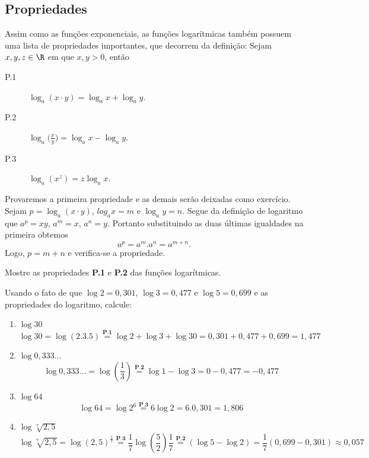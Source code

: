 \subsection{Propriedades}
Assim como as funções exponenciais, as funções logarítmicas também possuem uma lista de propriedades importantes, que decorrem da definição: Sejam $x, y,z\in\R$ em que $x,y > 0$, então
\begin{description}
	\item[P.1] $\log_a (x\cdot y)=\log_a x+\log_a y.$
	\item[P.2] $\log_a \big(\frac{x}{y}\big)=\log_a x-\log_a y.$
	\item[P.3] $\log_a (x^z)=z\log_a x.$
\end{description}
\color{red}
Provaremos a primeira propriedade e as demais serão deixadas como exercício. Sejam $p = \log_a (x\cdot y)$, $log_a x=m$ e $\log_a y=n$. Segue da definição de logaritmo que $a^p = xy$, $a^m = x$, $a^n = y$. Portanto substituindo as duas últimas igualdades na primeira obtemos
\[a^p = a^m.a^n=a^{m+n}.\]
Logo, $p=m+n$ e verifica-se a propriedade.
\color{black}
\begin{exer} Mostre as propriedades \textbf{P.1} e \textbf{P.2} das funções logarítmicas.
\end{exer}
\begin{exe}
Usando o fato de que $\log2=0,301$, $\log3=0,477$ e $\log 5= 0,699$ e as propriedades do logaritmo, calcule:
\begin{enumerate}
    \item[a)] $\log30$ \\
    \color{red}
    $$\log 30= \log(2.3.5)\stackrel{\textbf{P.1}}{=}\log 2+ \log 3+ \log 30 =0,301+ 0,477+ 0,699=1,477$$
    \color{black}
    \item[b)] $\log0,333...$ \\
    \color{red}
    $$\log 0,333...= \log \left( \frac{1}{3}\right)\stackrel{\textbf{P.2}}{=} \log 1- \log 3 =0-0,477=-0,477$$
    \color{black}
    \item[c)] $\log 64$ \\
     \color{red}
    $$\log 64= \log 2^6\stackrel{\textbf{P.3}}{=} 6\log2=6.0,301=1,806$$
     \color{black}
     \item[d)] $\log \sqrt[7]{2,5}$ \\
     \color{red}
     $$\log \sqrt[7]{2,5}= \log (2,5)^{\frac{1}{7}} \stackrel{\textbf{P.3}}{=} \frac{1}{7} \log \left(\frac{5}{2} \right) \frac{1}{7} \stackrel{\textbf{P.2}}{=} (\log 5-\log 2)= \frac{1}{7}(0,699-0,301) \approx 0,057 $$
     \color{black}
\end{enumerate}
\end{exe}

